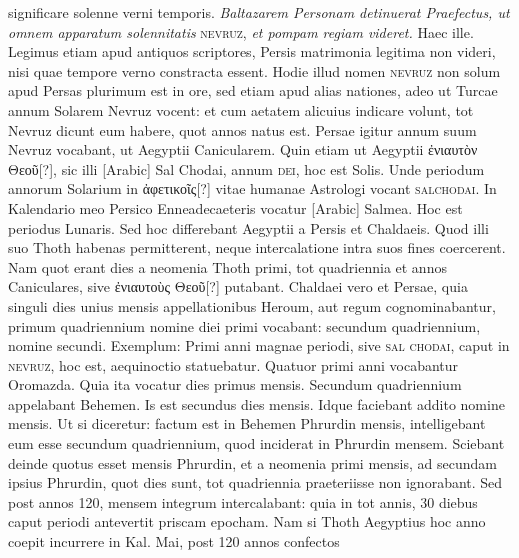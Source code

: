significare solenne verni temporis.
%
%
\textit{Baltazarem Personam detinuerat
Praefectus, ut omnem apparatum solennitatis} \textsc{nevruz}, \textit{et
pompam regiam videret.}
Haec ille.
Legimus etiam apud antiquos
scriptores, Persis matrimonia legitima non videri, nisi quae tempore
verno constracta essent.
Hodie illud nomen \textsc{nevruz} non solum
apud Persas plurimum est in ore, sed etiam apud alias nationes, adeo
ut Turcae annum Solarem Nevruz vocent: et cum aetatem alicuius
indicare volunt, tot Nevruz dicunt eum habere, quot annos
natus est.
Persae igitur annum suum Nevruz vocabant, ut Aegyptii
Canicularem.
Quin etiam ut Aegyptii \textgreek{ἐνιαυτὸν Θεοῦ}[?], sic illi
 \textarabic{
}[Arabic] Sal Chodai, annum \textsc{dei}, hoc est Solis.
Unde periodum
annorum Solarium in \textgreek{ἀφετικοῖς}[?] vitae humanae Astrologi vocant
\textsc{salchodai}.
In Kalendario meo Persico Enneadecaeteris vocatur
\textarabic{}[Arabic] Salmea. %
Hoc est periodus Lunaris.
Sed hoc differebant
Aegyptii a Persis et Chaldaeis. %
Quod illi suo Thoth habenas permitterent,
neque intercalatione intra suos fines coercerent.
Nam quot
erant dies a neomenia Thoth primi, tot quadriennia et annos Caniculares,
sive \textgreek{ἐνιαυτοὺς Θεοῦ}[?] putabant.
Chaldaei vero et Persae, quia
singuli dies unius mensis appellationibus Heroum, aut regum cognominabantur,
primum quadriennium nomine diei primi vocabant:
secundum quadriennium, nomine secundi.
Exemplum: Primi anni
magnae periodi, sive \textsc{sal chodai}, caput in \textsc{nevruz}, hoc est,
aequinoctio statuebatur.
Quatuor primi anni vocabantur Oromazda. %
Quia ita vocatur dies primus mensis.
Secundum quadriennium
appelabant Behemen.
Is est secundus dies mensis.
Idque faciebant
addito nomine mensis.
Ut si diceretur: factum est in Behemen Phrurdin
mensis, intelligebant eum esse secundum quadriennium, quod
inciderat in Phrurdin mensem.
Sciebant deinde quotus esset mensis
Phrurdin, et a neomenia primi mensis, ad secundam ipsius Phrurdin,
quot dies sunt, tot quadriennia praeteriisse non ignorabant.
Sed post
annos 120, mensem integrum intercalabant: quia in tot annis, 30
diebus caput periodi antevertit priscam epocham.
Nam si Thoth
Aegyptius hoc anno coepit incurrere in Kal. Mai, post 120 annos confectos
